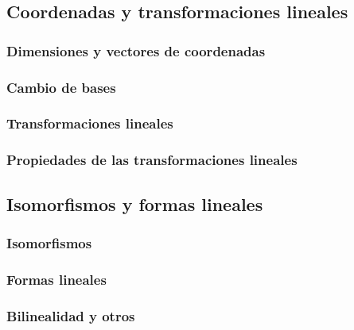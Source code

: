 \subsection{Coordenadas y transformaciones lineales} %
\label{sub:coordenadas_y_transformaciones_lineales}

\subsubsection{Dimensiones y vectores de coordenadas} %
\label{ssub:dimensiones_y_vectores_de_coordenadas}

\subsubsection{Cambio de bases} %
\label{ssub:cambio_de_bases}

\subsubsection{Transformaciones lineales} %
\label{ssub:transformaciones_lineales}

\subsubsection{Propiedades de las transformaciones lineales} %
\label{ssub:propiedades_de_las_transformaciones_lineales}

\subsection{Isomorfismos y formas lineales} %
\label{sub:isomorfismos_y_formas_lineales}

\subsubsection{Isomorfismos} %
\label{ssub:isomorfismos}

\subsubsection{Formas lineales} %
\label{ssub:formas_lineales}

\subsubsection{Bilinealidad y otros} %
\label{ssub:bilinealidad_y_otros}

